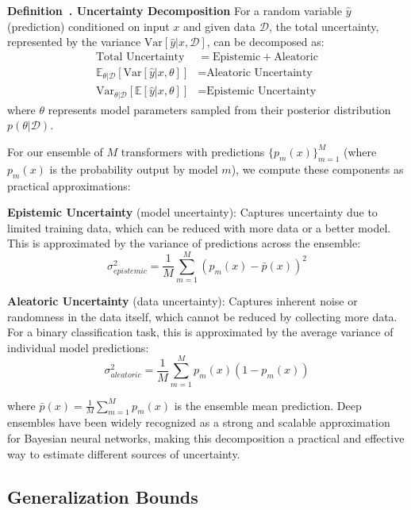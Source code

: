 \documentclass[journal]{IEEEtran}
\newcounter{definition}
\newenvironment{definition}[1][]{\refstepcounter{definition}\par\medskip
   \noindent \textbf{Definition~\thedefinition. #1} \rmfamily}{\medskip}
\begin{document}
\begin{definition}[Uncertainty Decomposition]
For a random variable $\hat{y}$ (prediction) conditioned on input $x$ and given data $\mathcal{D}$, the total uncertainty, represented by the variance $\text{Var}[\hat{y}|x, \mathcal{D}]$, can be decomposed as:
\begin{align}
\text{Total Uncertainty} &= \text{Epistemic} + \text{Aleatoric} \\
\mathbb{E}_{\theta|\mathcal{D}}[\text{Var}[\hat{y}|x,\theta]] &= \text{Aleatoric Uncertainty} \\
\text{Var}_{\theta|\mathcal{D}}[\mathbb{E}[\hat{y}|x,\theta]] &= \text{Epistemic Uncertainty}
\end{align}
where $\theta$ represents model parameters sampled from their posterior distribution $p(\theta|\mathcal{D})$.
\end{definition}

For our ensemble of $M$ transformers with predictions $\{p_m(x)\}_{m=1}^M$ (where $p_m(x)$ is the probability output by model $m$), we compute these components as practical approximations:

\textbf{Epistemic Uncertainty} (model uncertainty): Captures uncertainty due to limited training data, which can be reduced with more data or a better model. This is approximated by the variance of predictions across the ensemble:
\begin{equation}
\sigma_{epistemic}^2 = \frac{1}{M} \sum_{m=1}^M (p_m(x) - \bar{p}(x))^2
\end{equation}

\textbf{Aleatoric Uncertainty} (data uncertainty): Captures inherent noise or randomness in the data itself, which cannot be reduced by collecting more data. For a binary classification task, this is approximated by the average variance of individual model predictions:
\begin{equation}
\sigma_{aleatoric}^2 = \frac{1}{M} \sum_{m=1}^M p_m(x)(1 - p_m(x))
\end{equation}

where $\bar{p}(x) = \frac{1}{M} \sum_{m=1}^M p_m(x)$ is the ensemble mean prediction. Deep ensembles have been widely recognized as a strong and scalable approximation for Bayesian neural networks, making this decomposition a practical and effective way to estimate different sources of uncertainty.

\subsection{Generalization Bounds}
\end{document}
